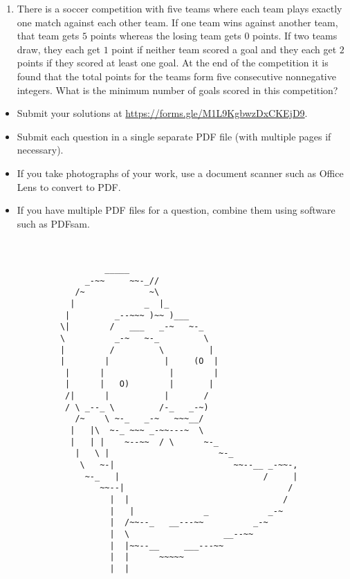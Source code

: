 \documentclass{article}
\begin{document}
\begin{enumerate}[1.]
\item %
There is a soccer competition with five teams where each team plays exactly one match against each other team.
If one team wins against another team, that team gets $5$ points whereas the losing team gets $0$ points.
If two teams draw, they each get $1$ point if neither team scored a goal and they each get $2$ points if they scored at least one goal.
At the end of the competition it is found that the total points for the teams form five consecutive nonnegative integers.
What is the minimum number of goals scored in this competition?

\end{enumerate}


\vfill
\begin{itemize}
	\item Submit your solutions at \url{https://forms.gle/M1L9KgbwzDxCKEjD9}.
	\item Submit each question in a single separate PDF file (with multiple pages if necessary).
	\item If you take photographs of your work, use a document scanner such as Office Lens to convert to PDF.
	\item If you have multiple PDF files for a question, combine them using software such as PDFsam.
\end{itemize}

\clearpage
~
\vfill
\centering
\begin{BVerbatim}
                     _____
                 _-~~     ~~-_//
               /~             ~\
              |              _  |_
             |         _--~~~ )~~ )___
            \|        /   ___   _-~   ~-_
            \          _-~   ~-_         \
            |         /         \         |
            |        |           |     (O  |
             |      |             |        |
             |      |   O)        |       |
             /|      |           |       /
             / \ _--_ \         /-_   _-~)
               /~    \ ~-_   _-~   ~~~__/
              |   |\  ~-_ ~~~ _-~~---~  \
              |   | |    ~--~~  / \      ~-_
               |   \ |                      ~-_
                \   ~-|                        ~~--__ _-~~-,
                 ~-_   |                             /     |
                    ~~--|                                 /
                      |  |                               /
                      |   |              _            _-~
                      |  /~~--_   __---~~          _-~
                      |  \                   __--~~
                      |  |~~--__     ___---~~
                      |  |      ~~~~~
                      |  |
\end{BVerbatim}
\vfill
\end{document}
